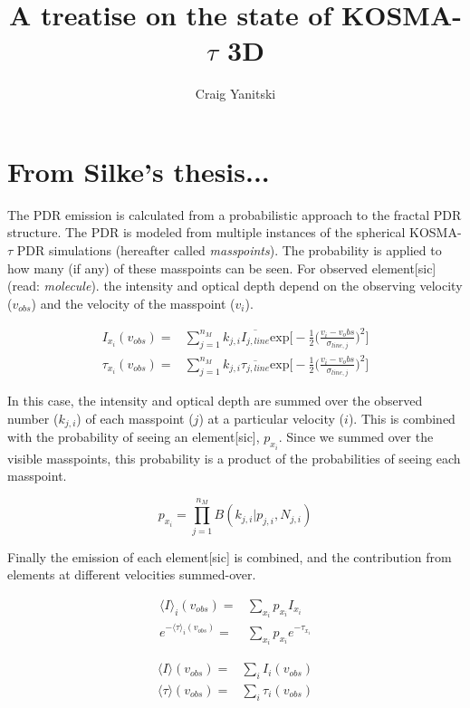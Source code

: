 \documentclass[onecolumn]{article}
\title{A treatise on the state of KOSMA-$\tau$ 3D}
\author{Craig Yanitski}
\date{}
\begin{document}
  \maketitle
  \section{From Silke's thesis...}
  The PDR emission is calculated from a probabilistic approach to the fractal PDR structure. The PDR is modeled from multiple instances of the spherical KOSMA-$\tau$ PDR simulations (hereafter called \textit{masspoints}). The probability is applied to how many (if any) of these masspoints can be seen. For observed element[sic] (read: \textit{molecule}). the intensity and optical depth depend on the observing velocity ($v_{obs}$) and the velocity of the masspoint ($v_i$).
  
  \begin{align*}
    I_{x_i}(v_{obs}) =& \sum_{j=1}^{n_M} k_{j,i} \overline{I_{j,line}} \mathrm{exp}\big[-\frac{1}{2}\big(\frac{v_i-v_obs}{\sigma_{line,j}}\big)^2\big] \\
    \tau_{x_i}(v_{obs}) =& \sum_{j=1}^{n_M} k_{j,i} \overline{\tau_{j,line}} \mathrm{exp}\big[-\frac{1}{2}\big(\frac{v_i-v_obs}{\sigma_{line,j}}\big)^2\big]
  \end{align*}
  
  In this case, the intensity and optical depth are summed over the observed number ($k_{j,i}$) of each masspoint ($j$) at a particular velocity ($i$). This is combined with the probability of seeing an element[sic], $p_{x_i}$. Since we summed over the visible masspoints, this probability is a product of the probabilities of seeing each masspoint.
  
  \begin{equation*}
    p_{x_i} = \prod_{j=1}^{n_M} B(k_{j,i}|p_{j,i}, N_{j,i})
  \end{equation*}
  
  Finally the emission of each element[sic] is combined, and the contribution from elements at different velocities summed-over.
  
  \begin{align*}
    \langle I \rangle_i(v_{obs}) =& \sum_{x_i} p_{x_i} I_{x_i} \\
    e^{-\langle \tau \rangle_i(v_{obs})} =& \sum_{x_i} p_{x_i} e^{-\tau_{x_i}}
  \end{align*}
  
  \begin{align*}
    \langle I \rangle(v_{obs}) =& \sum_{i} I_i(v_{obs}) \\
    \langle \tau \rangle(v_{obs}) =& \sum_{i} \tau_i(v_{obs})
  \end{align*}
  
\end{document}
